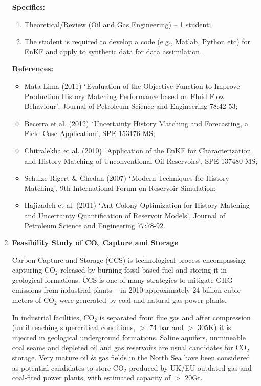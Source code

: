 \documentclass[12pts,a4paper,amsmath,amssymb,floatfix]{article}%
\begin{document}
\begin{enumerate}[label=\bfseries Project:]
\noindent
{\bf Specifics:} 
\noindent
\begin{enumerate}
\item Theoretical/Review (Oil and Gas Engineering) -- 1 student;
\item The student is required to develop a code (e.g., Matlab, Python etc) for EnKF and apply to synthetic data for data assimilation.
\end{enumerate}

\noindent
{\bf References:}
\begin{itemize}
\item Mata-Lima (2011) $\lq$Evaluation of the Objective Function to Improve Production History Matching Performance based on Fluid Flow Behaviour’, Journal of Petroleum Science and Engineering 78:42-53;
\item Becerra et al. (2012) $\lq$Uncertainty History Matching and Forecasting, a Field Case Application’, SPE 153176-MS;
\item Chitralekha et al.  (2010) $\lq$Application of the EnKF for Characterization and History Matching of Unconventional Oil Reservoirs’, SPE 137480-MS;
\item Schulze-Rigert $\&$ Ghedan (2007) $\lq$Modern Techniques for History Matching’, 9th International Forum on Reservoir Simulation;
\item Hajizadeh et al. (2011) $\lq$Ant Colony Optimization for History Matching and Uncertainty Quantification of Reservoir Models’, Journal of Petroleum Science and Engineering 77:78-92. 
\end{itemize}
%
\clearpage

\item {\bf Feasibility Study of CO$_{2}$ Capture and Storage}

Carbon Capture and Storage (CCS) is technological process encompassing capturing CO$_{2}$ released by burning fossil-based fuel and storing it in geological formations. CCS is one of many strategies to mitigate GHG emissions from industrial plants – in 2010 approximately 24 billion cubic meters of CO$_{2}$ were generated by coal and natural gas power plants. 

In industrial facilities, CO$_{2}$ is separated from flue gas and after compression (until reaching supercritical conditions, $>$ 74 bar and $>$ 305K) it is injected in geological underground formations. Saline aquifers, unmineable coal seams and depleted oil and gas reservoirs are usual candidates for CO$_{2}$ storage. Very mature oil $\&$ gas fields in the North Sea have been considered as potential candidates to store CO$_{2}$ produced by UK/EU outdated gas and coal-fired power plants, with estimated capacity of $>$ 20Gt.


\end{enumerate}
\end{document}
